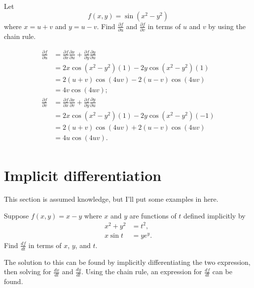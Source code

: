 \begin{example}
    Let \[ f(x, y) = \sin{(x^2 - y^2)} \] where $x = u + v$ and $y = u - v$. Find $\frac{\partial f}{\partial u}$ and $\frac{\partial f}{\partial v}$ in terms of $u$ and $v$ by using the chain rule.
    
    \begin{align*}
        \frac{\partial f}{\partial u} &= \frac{\partial f}{\partial x} \frac{\partial x}{\partial u} + \frac{\partial f}{\partial y} \frac{\partial y}{\partial u} \\
        &= 2 x \cos{(x^2 - y^2)} (1) - 2 y \cos{(x^2 - y^2)}(1) \\
        &= 2 (u + v) \cos{(4 u v)} - 2 (u - v) \cos{(4 u v)} \\
        &= 4v \cos{(4 u v)}; \\
        \frac{\partial f}{\partial v} &= \frac{\partial f}{\partial x} \frac{\partial x}{\partial v} + \frac{\partial f}{\partial y} \frac{\partial y}{\partial u} \\
        &= 2 x \cos{(x^2 - y^2)} (1) - 2 y \cos{(x^2 - y^2)} (-1) \\
        &= 2 (u + v) \cos{(4 u v)} + 2 (u - v) \cos{(4 u v)} \\
        &= 4 u \cos{(4 u v)}. \\
    \end{align*}
\end{example}

\section{Implicit differentiation}

This section is assumed knowledge, but I'll put some examples in here.

\begin{example}
    Suppose $f(x, y) = x - y$ where $x$ and $y$ are functions of $t$ defined implicitly by
    \begin{align*}
        x^2 + y^2 &= t^2, \\
        x \sin{t} &= y e^y.
    \end{align*}
    Find $\frac{df}{dt}$ in terms of $x$, $y$, and $t$.

    The solution to this can be found by implicitly differentiating the two expression, then solving for $\frac{dx}{dt}$ and $\frac{dy}{dt}$. Using the chain rule, an expression for $\frac{df}{dt}$ can be found.
\end{example}

